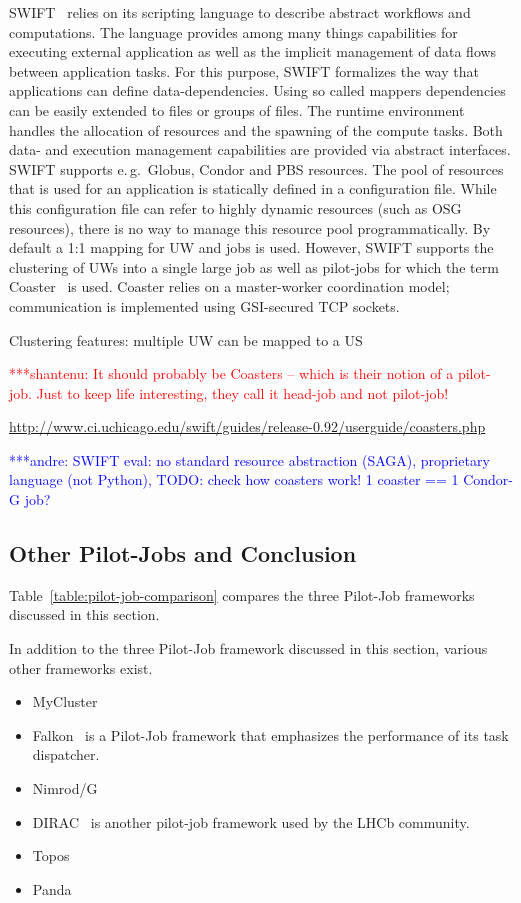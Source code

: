 \documentclass[conference,final]{IEEEtran}
\newcommand{\jhanote}[1]{ {\textcolor{red} { ***shantenu: #1 }}}
\newcommand{\alnote}[1]{ {\textcolor{blue} { ***andre: #1 }}}
\newcommand{\alnote}[1]{}
\newcommand{\jhanote}[1]{}
\begin{document}
SWIFT~\cite{Wilde2011} relies on its scripting language to describe abstract
workflows and computations. The language provides among many things capabilities
for executing external application as well as the implicit management of data
flows between application tasks. For this purpose, SWIFT formalizes the way that
applications can define data-dependencies. Using so called mappers dependencies
can be easily extended to files or groups of files. The runtime environment
handles the allocation of resources and the spawning of the compute tasks. Both
data- and execution management capabilities are provided via abstract
interfaces. SWIFT supports e.\,g.\ Globus, Condor and PBS resources. The pool of
resources that is used for an application is statically defined in a
configuration file. While this configuration file can refer to highly dynamic
resources (such as OSG resources), there is no way to manage this resource pool
programmatically. By default a 1:1 mapping for UW and jobs is used. However,
SWIFT supports the clustering of UWs into a single large job as well as
pilot-jobs for which the term Coaster~\cite{coasters} is used. Coaster relies on
a master-worker coordination model; communication is implemented using
GSI-secured TCP sockets.

Clustering features: multiple UW can be mapped to a US


\jhanote{It should probably be Coasters -- which is their notion of a pilot-job. Just
to keep life interesting, they call it head-job and not pilot-job!}

\url{http://www.ci.uchicago.edu/swift/guides/release-0.92/userguide/coasters.php}


\alnote{SWIFT eval: no standard resource abstraction (SAGA), proprietary 
language (not Python), TODO: check how coasters work! 1 coaster == 1 Condor-G 
job?}


\subsection{Other Pilot-Jobs and Conclusion}

Table~\ref{table:pilot-job-comparison} compares the three Pilot-Job frameworks 
discussed in this section.

In addition to the three Pilot-Job framework discussed in this section, various
other frameworks exist.
\begin{itemize}
    \item MyCluster
    \item Falkon~\cite{1362680} is a Pilot-Job framework that emphasizes the 
	performance of its task dispatcher.
    \item Nimrod/G
    \item DIRAC~\cite{1742-6596-219-6-062049} is another pilot-job framework 
	used by the LHCb community.
    \item Topos
    \item Panda    
\end{itemize}
\end{document}
